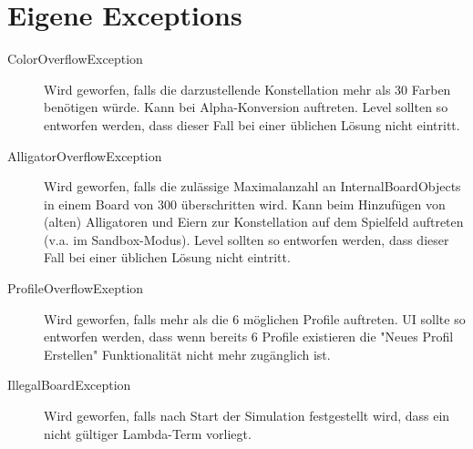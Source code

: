 \chapter{Eigene Exceptions}
\begin{description}
\item[ColorOverflowException] Wird geworfen, falls die darzustellende Konstellation mehr als 30 Farben benötigen würde.  Kann bei Alpha-Konversion auftreten. Level sollten so entworfen werden, dass dieser Fall bei einer üblichen Lösung nicht eintritt.
\item[AlligatorOverflowException] Wird geworfen, falls die zulässige Maximalanzahl an InternalBoardObjects in einem Board von 300 überschritten wird. Kann beim Hinzufügen von (alten) Alligatoren und Eiern zur Konstellation auf dem Spielfeld auftreten (v.a. im Sandbox-Modus).  Level sollten so entworfen werden, dass dieser Fall bei einer üblichen Lösung nicht eintritt.
\item[ProfileOverflowExeption] Wird geworfen, falls mehr als die 6 möglichen Profile auftreten. UI sollte so entworfen werden, dass wenn bereits 6 Profile existieren die "Neues Profil Erstellen" Funktionalität nicht mehr zugänglich ist.
\item[IllegalBoardException] Wird geworfen, falls nach Start der Simulation festgestellt wird, dass ein nicht gültiger Lambda-Term vorliegt.
\end{description}
